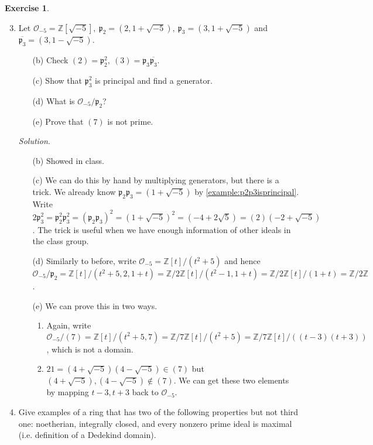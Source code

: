 \documentclass{article}
\newcommand{\Z}{\mathbb{Z}}
\newcommand{\ri}{\mathcal{O}}
\newcommand{\ip}{\mathfrak{p}}
\theoremstyle{definition}
\newtheorem{exe}[defn]{Exercise}
\begin{document}
\begin{exe}
\begin{enumerate}
\setcounter{enumi}{2}
\item Let $\ri_{-5}=\Z\left[\sqrt{-5}\right],\ \ip_2=\left(2,1+\sqrt{-5}\right),\ \ip_3=\left(3,1+\sqrt{-5}\right)$ and $\overline{\ip_3}=\left(3,1-\sqrt{-5}\right)$.
\begin{enumerate}
\item[(b)] Check $(2)=\ip_2^2,\ (3)=\ip_3\overline{\ip_3}$.
\item[(c)] Show that $\ip_3^2$ is principal and find a generator. 
\item[(d)] What is $\ri_{-5}/\ip_2$?
\item[(e)] Prove that $(7)$ is not prime.
\end{enumerate}

\textit{Solution}. \begin{enumerate}
\item[(b)] Showed in class.
\item[(c)] We can do this by hand by multiplying generators, but there is a trick. We already know $\ip_2\ip_3=\left(1+\sqrt{-5}\right)$ by \ref{example:p2p3isprincipal}. Write $2\ip_3^2=\ip_2^2\ip_3^2=(\ip_2\ip_3)^2=\left(1+\sqrt{-5}\right)^2=\left(-4+2\sqrt{5}\right)=(2)\left(-2+\sqrt{-5}\right)$. The trick is useful when we have enough information of other ideals in the class group.
\item[(d)] Similarly to before, write $\ri_{-5}=\Z[t]/(t^2+5)$ and hence $\ri_{-5}/\ip_2=\Z[t]/(t^2+5,2,1+t)=\Z/2\Z[t]/(t^2-1,1+t)=\Z/2\Z[t]/(1+t)=\Z/2\Z$.
\item[(e)] We can prove this in two ways.
\begin{enumerate}
\item Again, write $\ri_{-5}/(7)=\Z[t]/(t^2+5,7)=\Z/7\Z[t]/(t^2+5)=\Z/7\Z[t]/((t-3)(t+3))$, which is not a domain.
\item $21=\left(4+\sqrt{-5}\right)\left(4-\sqrt{-5}\right)\in (7)$ but $\left(4+\sqrt{-5}\right),\left(4-\sqrt{-5}\right)\notin (7)$. We can get these two elements by mapping $t-3,t+3$ back to $\ri_{-5}$.
\end{enumerate}
\end{enumerate}
\item Give examples of a ring that has two of the following properties but not third one: noetherian, integrally closed, and every nonzero prime ideal is maximal (i.e. definition of a Dedekind domain).


\end{enumerate}
\end{exe}
\end{document}
